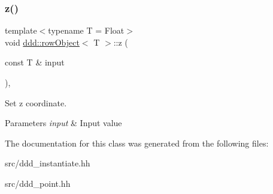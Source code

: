 \subsubsection{\texorpdfstring{z()}{z()}}
{\footnotesize\ttfamily template$<$typename T  = Float$>$ \\
void \hyperlink{classddd_1_1row_object}{ddd\+::row\+Object}$<$ T $>$\+::z (\begin{DoxyParamCaption}\item[{const T \&}]{input }\end{DoxyParamCaption})\hspace{0.3cm}{\ttfamily [inline]}, {\ttfamily [inherited]}}



Set z coordinate. 


\begin{DoxyParams}{Parameters}
{\em input} & Input value \\
\hline
\end{DoxyParams}


The documentation for this class was generated from the following files\+:\begin{DoxyCompactItemize}
\item 
src/ddd\+\_\+instantiate.\+hh\item 
src/ddd\+\_\+point.\+hh\end{DoxyCompactItemize}
